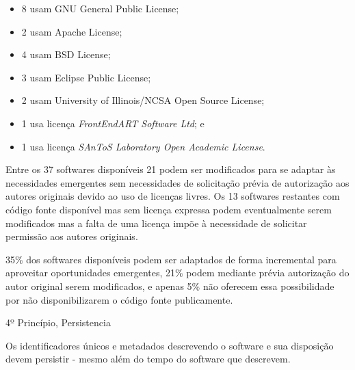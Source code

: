 \begin{itemize}
  \item 8 usam GNU General Public License;
  \item 2 usam Apache License;
  \item 4 usam BSD License;
  \item 3 usam Eclipse Public License;
  \item 2 usam University of Illinois/NCSA Open Source License;
  \item 1 usa licença {\it FrontEndART Software Ltd}; e
  \item 1 usa licença {\it SAnToS Laboratory Open Academic License}.
\end{itemize}

Entre os 37 softwares disponíveis 21 podem ser modificados para se adaptar às
necessidades emergentes sem necessidades de solicitação prévia de autorização
aos autores originais devido ao uso de licenças livres. Os 13 softwares
restantes com código fonte disponível mas sem licença expressa podem
eventualmente serem modificados mas a falta de uma licença impõe à necessidade
de solicitar permissão aos autores originais.

35\% dos softwares disponíveis podem ser adaptados de forma incremental para
aproveitar oportunidades emergentes, 21\% podem mediante prévia autorização do
autor original serem modificados, e apenas 5\% não oferecem essa possibilidade
por não disponibilizarem o código fonte publicamente.

4º Princípio, Persistencia

Os identificadores únicos e metadados descrevendo o software e sua disposição
devem persistir - mesmo além do tempo do software que descrevem.



